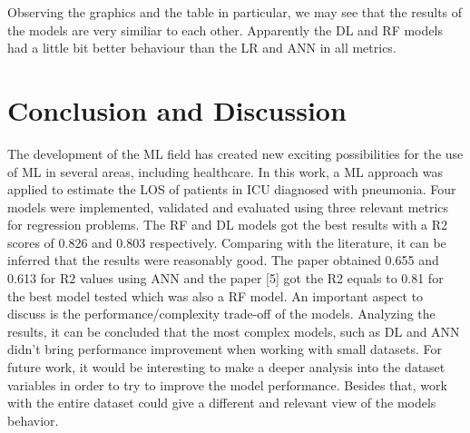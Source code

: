 \documentclass[journal]{IEEEtran} %
\begin{document}
Observing the graphics and the table in particular, we may see that the results of the models are very similiar to each other. Apparently the DL and RF models had a little bit better behaviour than the LR and ANN in all metrics.

\section{Conclusion and Discussion}
The development of the ML field has created new exciting possibilities for the use of ML in several areas, including healthcare. In this work, a ML approach was
applied to estimate the LOS of patients in ICU diagnosed with pneumonia. Four models were implemented, validated and evaluated using three relevant metrics for regression problems. The RF and DL models got the best results with a R2 scores of 0.826 and 0.803 respectively. Comparing with the literature, it can be inferred that the results were reasonably good. The paper \cite{Zolbanin2022} obtained 0.655 and 0.613 for R2 values using ANN and the paper [5] got the R2 equals to 0.81 for the best model tested which was also a RF model.\newline
An important aspect to discuss is the performance/complexity trade-off of the models. Analyzing the results, it can be concluded that the most complex models, such as DL and ANN didn't bring performance improvement when working with small datasets.
For future work, it would be interesting to make a deeper analysis into the dataset variables in order to try to improve the model performance. Besides that, work with the entire dataset could give a different and relevant view of the models behavior.

  
  
\end{document}
